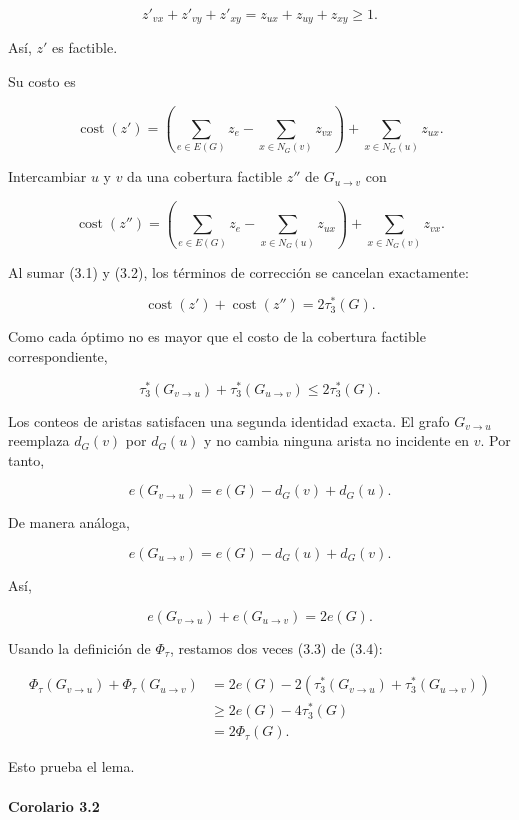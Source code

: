 \documentclass[spanish,11pt,a4paper]{article}
\begin{document}
\[
z'_{vx}+z'_{vy}+z'_{xy}
=
z_{ux}+z_{uy}+z_{xy}
\ge1.
\]

Así, \(z'\) es factible.

Su costo es

\[
\operatorname{cost}(z')
=
\left(
\sum_{e\in E(G)}z_e
-
\sum_{x\in N_G(v)}z_{vx}
\right)
+
\sum_{x\in N_G(u)}z_{ux}.
\tag{3.1}
\]

Intercambiar \(u\) y \(v\) da una cobertura factible \(z''\) de
\(G_{u\to v}\) con

\[
\operatorname{cost}(z'')
=
\left(
\sum_{e\in E(G)}z_e
-
\sum_{x\in N_G(u)}z_{ux}
\right)
+
\sum_{x\in N_G(v)}z_{vx}.
\tag{3.2}
\]

Al sumar (3.1) y (3.2), los términos de corrección se cancelan
exactamente:

\[
\operatorname{cost}(z')
+
\operatorname{cost}(z'')
=
2\tau_3^*(G).
\]

Como cada óptimo no es mayor que el costo de la cobertura factible
correspondiente,

\[
\tau_3^*(G_{v\to u})
+
\tau_3^*(G_{u\to v})
\le
2\tau_3^*(G).
\tag{3.3}
\]

Los conteos de aristas satisfacen una segunda identidad exacta. El grafo
\(G_{v\to u}\) reemplaza \(d_G(v)\) por \(d_G(u)\) y no cambia ninguna
arista no incidente en \(v\). Por tanto,

\[
e(G_{v\to u})
=
e(G)-d_G(v)+d_G(u).
\]

De manera análoga,

\[
e(G_{u\to v})
=
e(G)-d_G(u)+d_G(v).
\]

Así,

\[
e(G_{v\to u})+e(G_{u\to v})=2e(G).
\tag{3.4}
\]

Usando la definición de \(\Phi_\tau\), restamos dos veces (3.3) de
(3.4):

\[
\begin{aligned}
\Phi_\tau(G_{v\to u})
+
\Phi_\tau(G_{u\to v})
&=
2e(G)
-
2\left(
\tau_3^*(G_{v\to u})
+
\tau_3^*(G_{u\to v})
\right)\\
&\ge
2e(G)-4\tau_3^*(G)\\
&=
2\Phi_\tau(G).
\end{aligned}
\]

Esto prueba el lema.

\paragraph{Corolario 3.2}\label{corolario-3.2}
\end{document}
